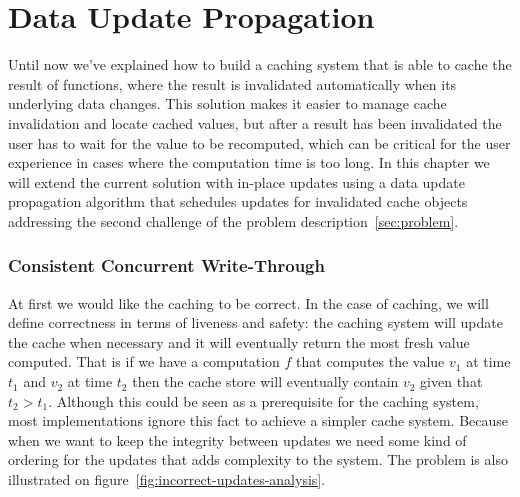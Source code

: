 \chapter{Data Update Propagation}
\label{chapter:data-update-propagation}

Until now we've explained how to build a caching system that is able to cache the result of functions, where the result is invalidated automatically when its underlying data changes. This solution makes it easier to manage cache invalidation and locate cached values, but after a result has been invalidated the user has to wait for the value to be recomputed, which can be critical for the user experience in cases where the computation time is too long.
In this chapter we will extend the current solution with in-place updates using a data update propagation algorithm that schedules updates for invalidated cache objects addressing the second challenge of the problem description~\ref{sec:problem}.


\subsection{Consistent Concurrent Write-Through}
\label{subsec:consistent_concurrent_write_through}


At first we would like the caching to be correct. In the case of caching, we will define correctness in terms of liveness and safety: the caching system will update the cache when necessary and it will eventually return the most fresh value computed. That is if we have a computation $f$ that computes the value $v_1$ at time $t_1$ and $v_2$ at time $t_2$ then the cache store will eventually contain $v_2$ given that $t_2 > t_1$. Although this could be seen as a prerequisite for the caching system, most implementations ignore this fact to achieve a simpler cache system. Because when we want to keep the integrity between updates we need some kind of ordering for the updates that adds complexity to the system. The problem is also illustrated on figure~\ref{fig:incorrect-updates-analysis}.

